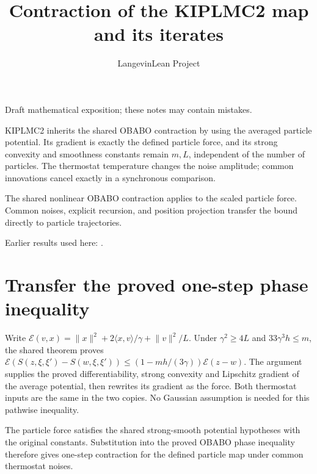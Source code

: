 \documentclass[11pt,a4paper]{article}
\title{\texorpdfstring{Contraction of the KIPLMC2 map and its iterates}{Contraction of the KIPLMC2 map and its iterates}}
\author{LangevinLean Project}
\date{}
\begin{document}
\maketitle
Draft mathematical exposition; these notes may contain mistakes.


KIPLMC2 inherits the shared OBABO contraction by using the averaged particle potential. Its gradient is exactly the defined particle force, and its strong convexity and smoothness constants remain \(m,L\), independent of the number of particles. The thermostat temperature changes the noise amplitude; common innovations cancel exactly in a synchronous comparison.



The shared nonlinear OBABO contraction applies to the scaled particle force. Common noises, explicit recursion, and position projection transfer the bound directly to particle trajectories.



Earlier results used here: \cite[Section~3.112]{LangevinLean2026Kinetic}.

\section{\texorpdfstring{Transfer the proved one-step phase inequality}{Transfer the proved one-step phase inequality}}


Write \(\mathcal E(v,x)=\lVert x\rVert^2+2\langle x,v\rangle/\gamma+\lVert v\rVert^2/L\). Under \(\gamma^2\ge4L\) and \(33\gamma^3h\le m\), the shared theorem proves \(\mathcal E(S(z,\xi,\xi\prime)-S(w,\xi,\xi\prime))\le(1-mh/(3\gamma))\mathcal E(z-w)\). The argument supplies the proved differentiability, strong convexity and Lipschitz gradient of the average potential, then rewrites its gradient as the force. Both thermostat inputs are the same in the two copies. No Gaussian assumption is needed for this pathwise inequality.



The particle force satisfies the shared strong-smooth potential hypotheses with the original constants. Substitution into the proved OBABO phase inequality therefore gives one-step contraction for the defined particle map under common thermostat noises.
\end{document}
